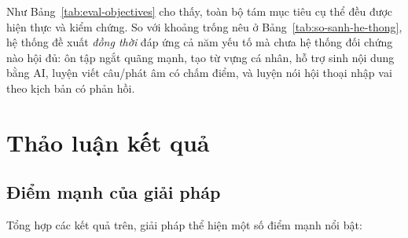 Như Bảng~\ref{tab:eval-objectives} cho thấy, toàn bộ tám mục tiêu cụ thể đều
được hiện thực và kiểm chứng. So với khoảng trống nêu ở
Bảng~\ref{tab:so-sanh-he-thong}, hệ thống đề xuất \textit{đồng thời} đáp ứng cả
năm yếu tố mà chưa hệ thống đối chứng nào hội đủ: ôn tập ngắt quãng mạnh, tạo
từ vựng cá nhân, hỗ trợ sinh nội dung bằng AI, luyện viết câu/phát âm có chấm
điểm, và luyện nói hội thoại nhập vai theo kịch bản có phản hồi.

\section{Thảo luận kết quả}
\label{sec:thao-luan}

\subsection{Điểm mạnh của giải pháp}
\label{subsec:diem-manh}

Tổng hợp các kết quả trên, giải pháp thể hiện một số điểm mạnh nổi bật:

